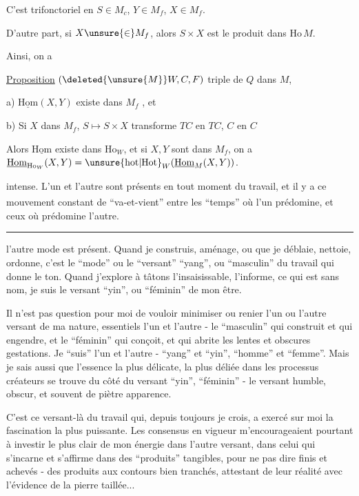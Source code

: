 C'est trifonctoriel en $S\in M_c$, $Y\in M_f$, $X\in M_f$.

D'autre part, si $X\unsure{\in} M_f$, alors $S\times X$ est  le produit dans $\mathrm{Ho}\,M$.

Ainsi, on a

\uline{Proposition} $(\deleted{\unsure{M}}W,C,F)$ triple de $Q$ dans $M$, 

a) $\underline{\mathrm{Hom}}(X,Y)$ existe dans $M_f$  , et 

b) Si $X$ dans $M_f$, $S\longmapsto S\times X$ transforme $TC$ en $TC$, $C$ en $C$

Alors $\underline{\mathrm{Hom}}$  existe dans $\mathrm{Ho}_W$, et si $X,Y$ sont dans $M_f$, on a $\underline{\mathrm{Hom}}_{\mathrm{Ho}_W}(X,Y)=\unsure{\mathrm{hot}|\mathrm{Hot}}_W(\underline{\mathrm{Hom}}_M(X,Y))$.

intense. L'un et l'autre sont présents en tout moment du travail, et il y a ce mouvement constant de ``va-et\textsuperscript{}-vient'' entre les ``temps'' où l'un prédomine, et ceux où prédomine l'autre.

\noindent\rule{2.1cm}{0.4pt}

l'autre mode est présent. Quand je construis, aménage, ou que je déblaie, nettoie, ordonne, c'est le ``mode'' ou le ``versant'' ``yang'', ou ``masculin'' du travail qui donne le ton. Quand j'explore à tâtons l'insaisissable, l'informe, ce qui est sans nom, je suis le versant ``yin'', ou ``féminin'' de mon être.

Il n'est pas question pour moi de vouloir minimiser ou renier l'un ou l'autre versant de ma nature, essentiels l'un et l'autre - le ``masculin'' qui construit et qui engendre, et le ``féminin'' qui conçoit, et qui abrite les lentes et obscures gestations. Je ``suis'' l'un et l'autre - ``yang'' et ``yin'', ``homme'' et ``femme''. Mais je sais aussi que l'essence la plus délicate, la plus déliée dans les processus créateurs se trouve du côté du versant ``yin'', ``féminin'' - le versant humble, obscur, et souvent de piètre apparence.

C'est ce versant-là du travail qui, depuis toujours je crois, a exercé sur moi la fascination la plus puissante. Les consensus en vigueur m'encourageaient pourtant à investir le plus clair de mon énergie dans l'autre versant, dans celui qui s'incarne et s'affirme dans des ``produits'' tangibles, pour ne pas dire finis et achevés - des produits aux contours bien tranchés, attestant de leur réalité avec l'évidence de la pierre taillée...

